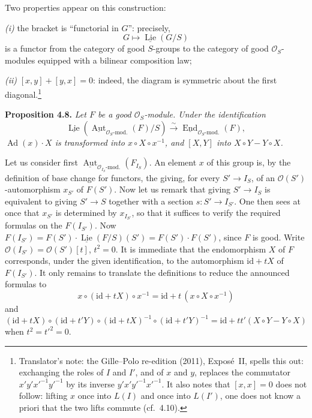 Two properties appear on this construction:

\textit{(i)} the bracket is ``functorial in \(G\)'': precisely,
\[
 G\longmapsto\underline{\operatorname{Lie}}(G/S)
\]
is a functor from the category of good \(S\)-groups to the category of
good \(\mathcal O_S\)-modules equipped with a bilinear composition law;

\textit{(ii)} \([x,y]+[y,x]=0\): indeed, the diagram is symmetric about
the first diagonal.\footnote{Translator's note: the Gille--Polo re-edition
(2011), Expos\'e~II, spells this out: exchanging the roles of \(I\) and
\(I'\), and of \(x\) and \(y\), replaces the commutator
\(x'y'x'^{-1}y'^{-1}\) by its inverse \(y'x'y'^{-1}x'^{-1}\). It also notes
that \([x,x]=0\) does not follow: lifting \(x\) once into \(L(I)\) and once
into \(L(I')\), one does not know a priori that the two lifts commute
(cf.\ 4.10).}

\medskip
\noindent{}\textbf{Proposition 4.8.}
\textit{Let \(F\) be a good \(\mathcal O_S\)-module. Under the
identification}
\[
 \underline{\operatorname{Lie}}\!
  \left(\underline{\operatorname{Aut}}_{\mathcal O_S\text{-mod.}}(F)/S\right)
 \xrightarrow{\sim}
 \underline{\operatorname{End}}_{\mathcal O_S\text{-mod.}}(F),
\]
\textit{\(\operatorname{Ad}(x)\cdot X\) is transformed into
\(x\circ X\circ x^{-1}\), and \([X,Y]\) into \(X\circ Y-Y\circ X\).}

Let us consider first
\(\underline{\operatorname{Aut}}_{\mathcal O_{I_S}\text{-mod.}}(F_{I_S})\).
An element \(x\) of this group is, by the definition of base change for
functors, the giving, for every \(S'\to I_S\), of an
\(\mathcal O(S')\)-automorphism \(x_{S'}\) of \(F(S')\). Now let us remark
that giving \(S'\to I_S\) is equivalent to giving \(S'\to S\) together with
a section \(s:S'\to I_{S'}\). One then sees at once that \(x_{S'}\) is
determined by \(x_{I_{S'}}\), so that it suffices to verify the required
formulas on the \(F(I_{S'})\). Now
\(F(I_{S'})=F(S')\cdot\underline{\operatorname{Lie}}(F/S)(S')=F(S')\cdot F(S')\),
since \(F\) is good. Write \(\mathcal O(I_{S'})=\mathcal O(S')[t]\),
\(t^2=0\). It is immediate that the endomorphism \(X\) of \(F\)
corresponds, under the given identification, to the automorphism
\(\mathrm{id}+tX\) of \(F(I_{S'})\). It only remains to translate the
definitions to reduce the announced formulas to
\[
 x\circ(\mathrm{id}+tX)\circ x^{-1}=\mathrm{id}+t\,(x\circ X\circ x^{-1})
\]
and
\[
 (\mathrm{id}+tX)\circ(\mathrm{id}+t'Y)\circ(\mathrm{id}+tX)^{-1}
 \circ(\mathrm{id}+t'Y)^{-1}=\mathrm{id}+tt'(X\circ Y-Y\circ X)
\]
when \(t^2=t'^2=0\).

